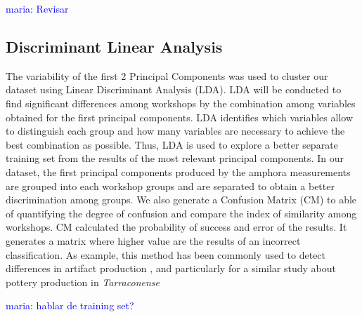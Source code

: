 \documentclass[review]{elsarticle}
\newcommand{\memo}[2]{\textcolor{#1}{#2}}
\newcommand{\maria}[1]{\memo{blue}{maria: #1\\}}
\begin{document}
\maria{Revisar}

\subsection{Discriminant Linear Analysis} 

The variability of the first 2 Principal Components was used to cluster our dataset using Linear Discriminant Analysis (LDA). LDA will be conducted to find significant differences among workshops by the combination among variables obtained for the first principal components. LDA identifies which variables allow to distinguish each group and how many variables are necessary to achieve the best combination as possible. Thus, LDA is used to explore a better separate training set from the results of the most relevant principal components. In our dataset, the first principal components produced by the amphora measurements are grouped into each workshop groups and are separated to obtain a better discrimination among groups. 
We also generate a Confusion Matrix (CM) to able of quantifying the degree of confusion and compare the index of similarity among workshops.  CM calculated the probability of success and error of the results. It generates a matrix where higher value are the results of an incorrect classification. As example, this method has been commonly used to detect differences in artifact production \citep{charlton_investigating_2012, thorpe_distribution_1984}, and particularly for a similar study about pottery production in \emph{Tarraconense} \citep{i_martin_alisis_1998}


\maria{hablar de training set?}
\end{document}
